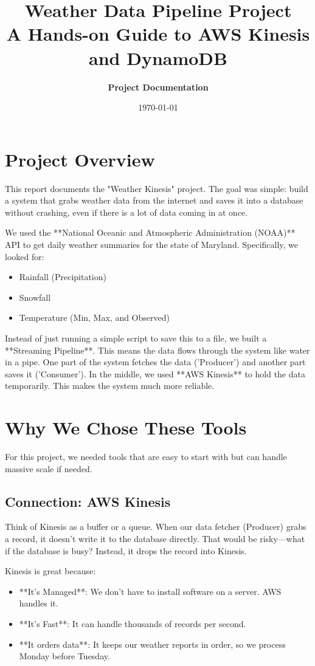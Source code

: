 \documentclass[12pt, a4paper]{article}
\title{
    \vspace{2cm}
    \Huge \textbf{Weather Data Pipeline Project} \\
    \vspace{0.5cm}
    \Large \textbf{A Hands-on Guide to AWS Kinesis and DynamoDB}
    \vspace{3cm}
}
\author{
    \Large \textbf{Project Documentation}
}
\date{\today}
\begin{document}
\maketitle
\thispagestyle{empty}
\newpage

\tableofcontents
\newpage

\section{Project Overview}

This report documents the "Weather Kinesis" project. The goal was simple: build a system that grabs weather data from the internet and saves it into a database without crashing, even if there is a lot of data coming in at once.

We used the **National Oceanic and Atmospheric Administration (NOAA)** API to get daily weather summaries for the state of Maryland. Specifically, we looked for:
\begin{itemize}
    \item Rainfall (Precipitation)
    \item Snowfall
    \item Temperature (Min, Max, and Observed)
\end{itemize}

Instead of just running a simple script to save this to a file, we built a **Streaming Pipeline**. This means the data flows through the system like water in a pipe. One part of the system fetches the data ('Producer') and another part saves it ('Consumer'). In the middle, we used **AWS Kinesis** to hold the data temporarily. This makes the system much more reliable.

\section{Why We Chose These Tools}

For this project, we needed tools that are easy to start with but can handle massive scale if needed.

\subsection{Connection: AWS Kinesis}
Think of Kinesis as a buffer or a queue. When our data fetcher (Producer) grabs a record, it doesn't write it to the database directly. That would be risky—what if the database is busy? Instead, it drops the record into Kinesis. 

Kinesis is great because:
\begin{itemize}
    \item **It's Managed**: We don't have to install software on a server. AWS handles it.
    \item **It's Fast**: It can handle thousands of records per second.
    \item **It orders data**: It keeps our weather reports in order, so we process Monday before Tuesday.
\end{itemize}
\end{document}
